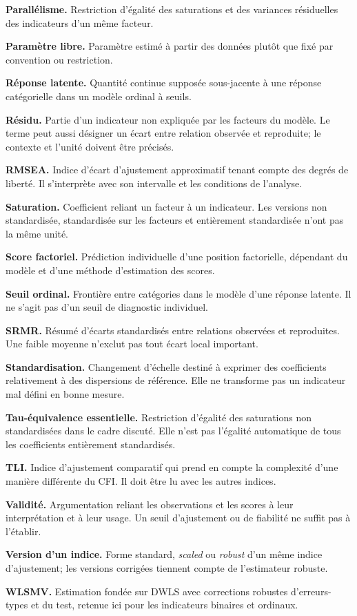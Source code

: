 \documentclass[
  french,
  11pt,
  a4paper,
  DIV=11,
  numbers=noendperiod]{scrreprt}
\begin{document}
\textbf{Parallélisme.} Restriction d'égalité des saturations et des
variances résiduelles des indicateurs d'un même facteur.

\textbf{Paramètre libre.} Paramètre estimé à partir des données plutôt
que fixé par convention ou restriction.

\textbf{Réponse latente.} Quantité continue supposée sous-jacente à une
réponse catégorielle dans un modèle ordinal à seuils.

\textbf{Résidu.} Partie d'un indicateur non expliquée par les facteurs
du modèle. Le terme peut aussi désigner un écart entre relation observée
et reproduite; le contexte et l'unité doivent être précisés.

\textbf{RMSEA.} Indice d'écart d'ajustement approximatif tenant compte
des degrés de liberté. Il s'interprète avec son intervalle et les
conditions de l'analyse.

\textbf{Saturation.} Coefficient reliant un facteur à un indicateur. Les
versions non standardisée, standardisée sur les facteurs et entièrement
standardisée n'ont pas la même unité.

\textbf{Score factoriel.} Prédiction individuelle d'une position
factorielle, dépendant du modèle et d'une méthode d'estimation des
scores.

\textbf{Seuil ordinal.} Frontière entre catégories dans le modèle d'une
réponse latente. Il ne s'agit pas d'un seuil de diagnostic individuel.

\textbf{SRMR.} Résumé d'écarts standardisés entre relations observées et
reproduites. Une faible moyenne n'exclut pas tout écart local important.

\textbf{Standardisation.} Changement d'échelle destiné à exprimer des
coefficients relativement à des dispersions de référence. Elle ne
transforme pas un indicateur mal défini en bonne mesure.

\textbf{Tau-équivalence essentielle.} Restriction d'égalité des
saturations non standardisées dans le cadre discuté. Elle n'est pas
l'égalité automatique de tous les coefficients entièrement standardisés.

\textbf{TLI.} Indice d'ajustement comparatif qui prend en compte la
complexité d'une manière différente du CFI. Il doit être lu avec les
autres indices.

\textbf{Validité.} Argumentation reliant les observations et les scores
à leur interprétation et à leur usage. Un seuil d'ajustement ou de
fiabilité ne suffit pas à l'établir.

\textbf{Version d'un indice.} Forme standard, \emph{scaled} ou
\emph{robust} d'un même indice d'ajustement; les versions corrigées
tiennent compte de l'estimateur robuste.

\textbf{WLSMV.} Estimation fondée sur DWLS avec corrections robustes
d'erreurs-types et du test, retenue ici pour les indicateurs binaires et
ordinaux.
\end{document}
